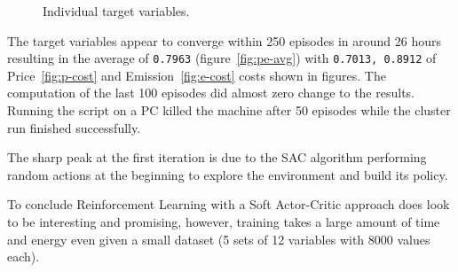 \documentclass{article}
\numberwithin{equation}{subsection}
\begin{document}
	\begin{figure}[H]
		\centering	
		\caption{Individual target variables.}
	\end{figure}
	
The target variables appear to converge within 250 episodes in around 26 hours resulting in the average of \verb!0.7963! (figure~\ref{fig:pe-avg}) with \verb!0.7013, 0.8912! of Price~\ref{fig:p-cost} and Emission~\ref{fig:e-cost} costs shown in figures. The computation of the last 100 episodes did almost zero change to the results. Running the script on a PC killed the machine after 50 episodes while the cluster run finished successfully. 

The sharp peak at the first iteration is due to the SAC algorithm performing random actions at the beginning to explore the environment and build its policy. 

To conclude Reinforcement Learning with a Soft Actor-Critic approach does look to be interesting and promising, however, training takes a large amount of time and energy even given a small dataset (5 sets of 12 variables with 8000 values each). 
		



			 	
	 	
	 	


 
\end{document}
